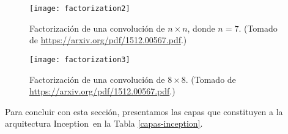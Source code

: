 \begin{figure}[H]
  \centering
  \texttt{[image: factorization2]}
  \caption{Factorización de una convolución de $n \times n$, donde $n = 7$.
    (Tomado de \url{https://arxiv.org/pdf/1512.00567.pdf}.)}
  \label{factorization2}
\end{figure}

\begin{figure}[H]
  \centering
  \texttt{[image: factorization3]}
  \caption{Factorización de una convolución de $8 \times 8$.
    (Tomado de \url{https://arxiv.org/pdf/1512.00567.pdf}.)}
  \label{factorization3}
\end{figure}

Para concluir con esta sección, presentamos las capas que constituyen a la arquitectura Inception\
en la Tabla \ref{capas-inception}.

\noindent
\begin{table}[H]
  \caption{
    Las capas que conforman a la arquitectura convolucional \emph{Inception V3}.
    Normalmente, a la dimensión de la última capa se modifica dependiendo de la tarea de clasificación
    deseada. (Tomado de \url{https://arxiv.org/pdf/1512.00567.pdf}.)
  }
  \label{capas-inception}
\end{table}

